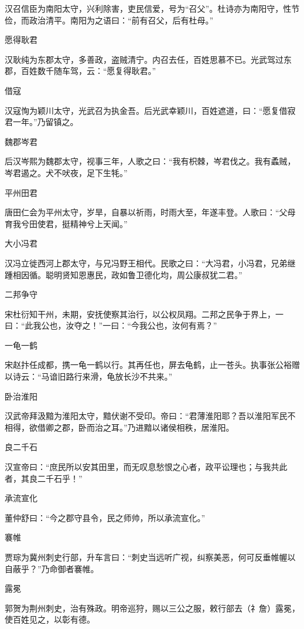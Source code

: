 \documentclass[a4paper,12pt,UTF8,twoside]{ctexbook}
\begin{document}
    汉召信臣为南阳太守，兴利除害，吏民信爱，号为“召父”。杜诗亦为南阳守，性节俭，而政治清平。南阳为之语曰：“前有召父，后有杜母。”
    
    愿得耿君
    
    汉耿纯为东郡太守，多善政，盗贼清宁。内召去任，百姓思慕不已。光武驾过东郡，百姓数千随车驾，云：“愿复得耿君。”
    
    借寇
    
    汉寇恂为颖川太守，光武召为执金吾。后光武幸颖川，百姓遮道，曰：“愿复借寂君一年。”乃留镇之。
    
    魏郡岑君
    
    后汉岑熙为魏郡太守，视事三年，人歌之曰：“我有枳棘，岑君伐之。我有蟊贼，岑君遏之。犬不吠夜，足下生牦。”
    
    平州田君
    
    唐田仁会为平州太守，岁旱，自暴以祈雨，时雨大至，年遂丰登。人歌曰：“父母育我兮田使君，挺精神兮上天闻。”
    
    大小冯君
    
    汉冯立徙西河上郡太守，与兄冯野王相代。民歌之曰：“大冯君，小冯君，兄弟继踵相因循。聪明贤知恩惠民，政如鲁卫德化均，周公康叔犹二君。”
    
    二邦争守
    
    宋杜衍知干州，未期，安抚使察其治行，以公权凤翔。二邦之民争于界上，一曰：“此我公也，汝夺之！”一曰：“今我公也，汝何有焉？”
    
    一龟一鹤
    
    宋赵抃任成都，携一龟一鹤以行。其再任也，屏去龟鹤，止一苍头。执事张公裕赠以诗云：“马谙旧路行来滑，龟放长沙不共来。”
    
    卧治淮阳
    
    汉武帝拜汲黯为淮阳太守，黯伏谢不受印。帝曰：“君薄淮阳耶？吾以淮阳军民不相得，欲借卿之郡，卧而治之耳。”乃进黯以诸侯相秩，居淮阳。
    
    良二千石
    
    汉宣帝曰：“庶民所以安其田里，而无叹息愁恨之心者，政平讼理也；与我共此者，其良二千石乎！”
    
    承流宣化
    
    董仲舒曰：“今之郡守县令，民之师帅，所以承流宣化。”
    
    褰帷
    
    贾琮为冀州刺史行部，升车言曰：“刺史当远听广视，纠察美恶，何可反垂帷幄以自蔽乎？”乃命御者褰帷。
    
    露冕
    
    郭贺为荆州刺史，治有殊政。明帝巡狩，赐以三公之服，敕行部去（礻詹）露冕，使百姓见之，以彰有德。
    
\end{document}
